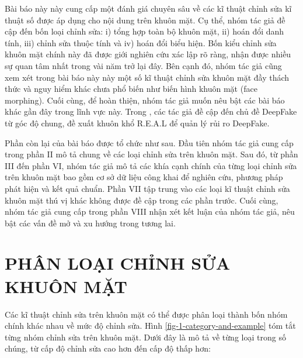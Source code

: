 \documentclass{article}
\begin{document}
Bài báo này này cung cấp một đánh giá chuyên sâu về các kĩ thuật chỉnh sửa kĩ thuật số được áp dụng cho nội dung trên khuôn mặt. Cụ thể, nhóm tác giả đề cập đến bốn loại chỉnh sửa: i) tổng hợp toàn bộ khuôn mặt, ii) hoán đổi danh tính, iii) chỉnh sửa thuộc tính và iv) hoán đổi biểu hiện. Bốn kiểu chỉnh sửa khuôn mặt chính này đã được giới nghiên cứu xác lập rõ ràng, nhận được nhiều sự quan tâm nhất trong vài năm trở lại đây. Bên cạnh đó, nhóm tác giả cũng xem xét trong bài báo này này một số kĩ thuật chỉnh sửa khuôn mặt đầy thách thức và nguy hiểm khác chưa phổ biến như biến hình khuôn mặt (face morphing). Cuối cùng, để hoàn thiện, nhóm tác giả muốn nêu bật các bài báo khác gần đây trong lĩnh vực này. Trong , các tác giả đề cập đến chủ đề DeepFake từ góc độ chung, đề xuất khuôn khổ R.E.A.L để quản lý rủi ro DeepFake.

Phần còn lại của bài báo được tổ chức như sau. Đầu tiên nhóm tác giả cung cấp trong phần II mô tả chung về các loại chỉnh sửa trên khuôn mặt. Sau đó, từ phần III đến phần VI, nhóm tác giả mô tả các khía cạnh chính của từng loại chỉnh sửa trên khuôn mặt bao gồm cơ sở dữ liệu công khai để nghiên cứu, phương pháp phát hiện và kết quả chuẩn. Phần VII tập trung vào các loại kĩ thuật chỉnh sửa khuôn mặt thú vị khác không được đề cập trong các phần trước. Cuối cùng, nhóm tác giả cung cấp trong phần VIII nhận xét kết luận của nhóm tác giả, nêu bật các vấn đề mở và xu hướng trong tương lai.


\section{PHÂN LOẠI CHỈNH SỬA KHUÔN MẶT} \label{sec:2-category}

Các kĩ thuật chỉnh sửa trên khuôn mặt có thể được phân loại thành bốn nhóm chính khác nhau về mức độ chỉnh sửa. Hình \ref{fig-1-category-and-example} tóm tắt từng nhóm chỉnh sửa trên khuôn mặt. Dưới đây là mô tả về từng loại trong số chúng, từ cấp độ chỉnh sửa cao hơn đến cấp độ thấp hơn:
\end{document}
